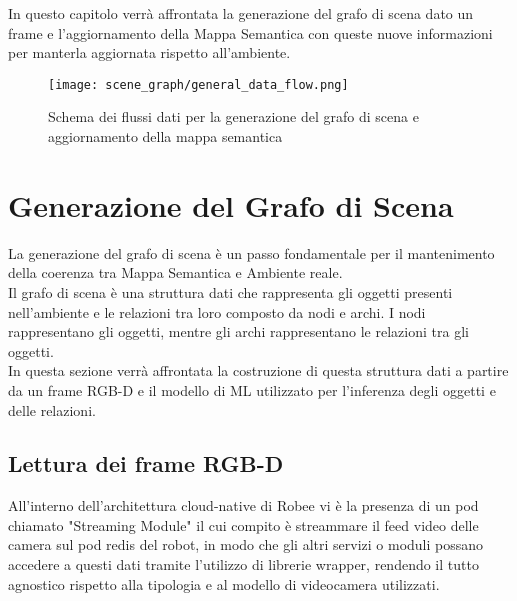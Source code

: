 In questo capitolo verrà affrontata la generazione del grafo di scena dato un frame e l'aggiornamento della Mappa Semantica con queste nuove informazioni per manterla aggiornata rispetto all'ambiente.
\begin{figure}[h]
	\texttt{[image: scene\_graph/general\_data\_flow.png]}
	\caption{Schema dei flussi dati per la generazione del grafo di scena e aggiornamento della mappa semantica }
\end{figure}

\section{Generazione del Grafo di Scena}
La generazione del grafo di scena è un passo fondamentale per il mantenimento della coerenza tra Mappa Semantica e Ambiente reale.\\
Il grafo di scena è una struttura dati che rappresenta gli oggetti presenti nell'ambiente e le relazioni tra loro composto da nodi e archi. I nodi rappresentano gli oggetti, mentre gli archi rappresentano le relazioni tra gli oggetti. \\
In questa sezione verrà affrontata la costruzione di questa struttura dati a partire da un frame RGB-D e il modello di ML utilizzato per l'inferenza degli oggetti e delle relazioni.
\subsection{Lettura dei frame RGB-D}
All'interno dell'architettura cloud-native di Robee vi è la presenza di un pod chiamato "Streaming Module" il cui compito è streammare il feed video delle camera sul pod redis del robot, in modo che gli altri servizi o moduli possano accedere a questi dati tramite l'utilizzo di librerie wrapper, rendendo il tutto agnostico rispetto alla tipologia e al modello di videocamera utilizzati.

